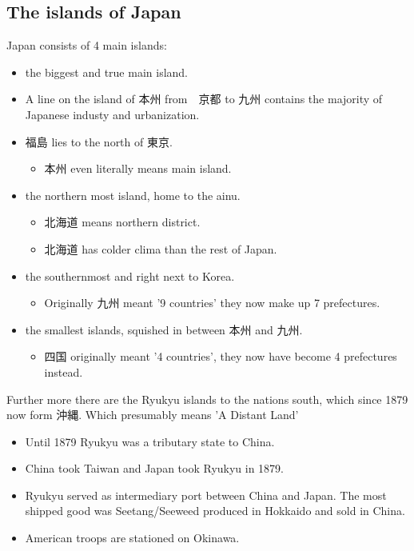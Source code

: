 \documentclass{article}
\begin{document}
\subsection{The islands of Japan }
Japan consists of 4 main islands: 
\begin{itemize}
\item {} the biggest and true main island.
\item A line on the island of 本州 from　京都 to 九州 contains the majority of Japanese industy and urbanization.
\item 福島 lies to the north of 東京.
\begin{itemize}
\item 本州 even literally means main island.
\end{itemize}
\item {} the northern most island, home to the ainu.
\begin{itemize}
\item 北海道 means northern district.
\item 北海道 has colder clima than the rest of Japan.
\end{itemize}
\item {} the southernmost and right next to Korea.
\begin{itemize}
\item Originally 九州 meant '9 countries' they now make up 7 prefectures.
\end{itemize}
\item {} the smallest islands, squished in between 本州 and 九州. 
\begin{itemize}
\item 四国 originally meant '4 countries', they now have become 4 prefectures instead.
\end{itemize}
\end{itemize} 
Further more there are the Ryukyu islands to the nations south, which since 1879 now form 沖縄. Which presumably means 'A Distant Land' \\
\begin{itemize}
\item Until 1879 Ryukyu was a tributary state to China.
\item China took Taiwan and Japan took Ryukyu in 1879.
\item Ryukyu served as intermediary port between China and Japan. The most shipped good was Seetang/Seeweed produced in Hokkaido and sold in China.
\item American troops are stationed on Okinawa.
\end{itemize}
\end{document}
